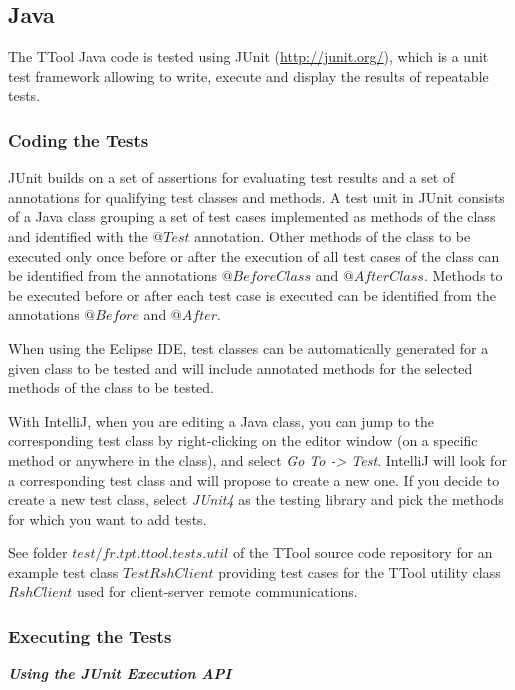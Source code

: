 \documentclass[12pt]{article}
\begin{document}
\subsection{Java}

The TTool Java code is tested using JUnit (\url{http://junit.org/}), which is a
unit test framework allowing to write, execute and display the results of
repeatable tests.

\subsubsection{Coding the Tests}

JUnit builds on a set of assertions for evaluating test results
and a set of annotations for qualifying test classes and methods. A test unit in
JUnit consists of a Java class grouping a set of test cases implemented as
methods of the class and identified with the $@Test$ annotation.
Other methods of the class to be executed only once before or after the
execution of all test cases of the class can be identified from the annotations
$@BeforeClass$ and $@AfterClass$. Methods to be executed before or after each
test case is executed can be identified from the annotations $@Before$ and
$@After$.

When using the Eclipse IDE, test classes can be automatically generated for a
given class to be tested and will include annotated methods for the selected
methods of the class to be tested.

With IntelliJ, when you are editing a Java class, you can jump to the corresponding test class
by right-clicking on the editor window (on a specific method or anywhere in the
class), and select \emph{Go To -> Test}.
IntelliJ will look for a corresponding test class and will propose to create a
new one. If you decide to create a new test class, select \emph{JUnit4} as the
testing library and pick the methods for which you want to add tests.

See folder $test/fr.tpt.ttool.tests.util$ of the TTool source code repository
for an example test class $TestRshClient$ providing test cases for the TTool
utility class $RshClient$ used for client-server remote communications.

\subsubsection{Executing the Tests}

\textbf{\emph{Using the JUnit Execution API}}
\end{document}
